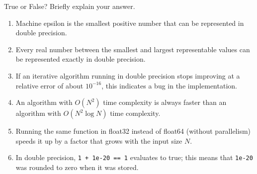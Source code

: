 \begin{exercise}
    True or False? Briefly explain your answer.
    \begin{enumerate}[label=(\alph*)]
        \item Machine epsilon is the smallest positive number that can be represented in double precision.
        \item Every real number between the smallest and largest representable values can be represented exactly in double precision.
        \item If an iterative algorithm running in double precision stops improving at a relative error of about $10^{-16}$, this indicates a bug in the implementation.
        \item An algorithm with $O(N^2)$ time complexity is always faster than an algorithm with $O(N^2 \log N)$ time complexity.
        \item Running the same function in float32 instead of float64 (without parallelism) speeds it up by a factor that grows with the input size $N$.
        \item In double precision, \texttt{1 + 1e-20 == 1} evaluates to true; this means that \texttt{1e-20} was rounded to zero when it was stored.
    \end{enumerate}
\end{exercise}

